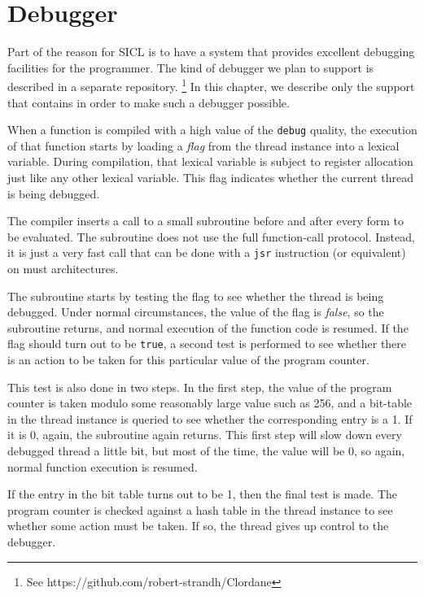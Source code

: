 \chapter{Debugger}
\label{chap-debugger}

Part of the reason for SICL is to have a system that provides
excellent debugging facilities for the programmer.  The kind of
debugger we plan to support is described in a separate repository.%
\footnote{See https://github.com/robert-strandh/Clordane}  In this
chapter, we describe only the support that \sysname{} contains in
order to make such a debugger possible.

When a function is compiled with a high value of the \texttt{debug}
quality, the execution of that function starts by loading a
\emph{flag} from the thread instance into a lexical variable.  During
compilation, that lexical variable is subject to register allocation
just like any other lexical variable.  This flag indicates whether the
current thread is being debugged.

The compiler inserts a call to a small subroutine before and after
every form to be evaluated.  The subroutine does not use the full
\commonlisp{} function-call protocol.  Instead, it is just a very fast
call that can be done with a \texttt{jsr} instruction (or equivalent)
on must architectures.


The subroutine starts by testing the flag to see whether the thread is
being debugged.  Under normal circumstances, the value of the flag is
\emph{false}, so the subroutine returns, and normal execution of the
function code is resumed.  If the flag should turn out to be
\texttt{true}, a second test is performed to see whether there is an
action to be taken for this particular value of the program counter.

This test is also done in two steps.  In the first step, the value of
the program counter is taken modulo some reasonably large value such
as 256, and a bit-table in the thread instance is queried to see
whether the corresponding entry is a 1.  If it is 0, again, the
subroutine again returns.  This first step will slow down every
debugged thread a little bit, but most of the time, the value will be
0, so again, normal function execution is resumed.

If the entry in the bit table turns out to be 1, then the final test
is made.  The program counter is checked against a hash table in the
thread instance to see whether some action must be taken.  If so, the
thread gives up control to the debugger.


